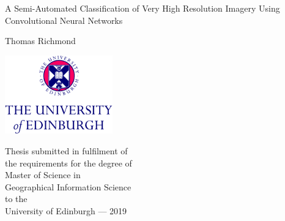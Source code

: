 \begin{minipage}{\textwidth}
\end{minipage}
\begin{center}
\vspace{2cm}
{ \Huge A Semi-Automated Classification of Very High Resolution Imagery Using Convolutional Neural Networks
  \par
  \vspace{0.5cm} 
{\Large Thomas Richmond \par}
}
\end{center}
\vfill
\begin{center}
\vspace{6cm}    
\centerline{\includegraphics[width=0.35\textwidth]{../preface/2Line2ColCMYK_CS3.pdf}}
\vspace{0.5cm}
Thesis submitted in fulfilment of\\
the requirements for the degree of\\ 
Master of Science in\\
Geographical Information Science\\
to the\\
University of Edinburgh --- 2019
\end{center}

\newpage

